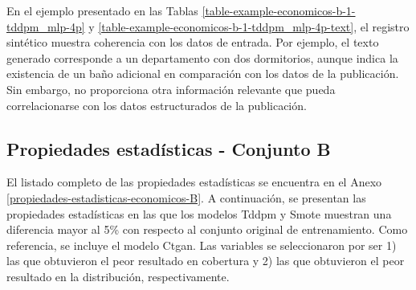 

\newpage
En el ejemplo presentado en las Tablas \ref{table-example-economicos-b-1-tddpm_mlp-4p} y \ref{table-example-economicos-b-1-tddpm_mlp-4p-text}, el registro sintético muestra coherencia con los datos de entrada. Por ejemplo, el texto generado corresponde a un departamento con dos dormitorios, aunque indica la existencia de un baño adicional en comparación con los datos de la publicación. Sin embargo, no proporciona otra información relevante que pueda correlacionarse con los datos estructurados de la publicación.



\newpage
\subsection{Propiedades estadísticas - Conjunto B}
\label{propiedades-conjunto-b}
El listado completo de las propiedades estadísticas se encuentra en el Anexo \ref{propiedades-estadisticas-economicos-B}. A continuación, se presentan las propiedades estadísticas en las que los modelos Tddpm y Smote muestran una diferencia mayor al 5\% con respecto al conjunto original de entrenamiento. Como referencia, se incluye el modelo Ctgan. Las variables se seleccionaron por ser 1) las que obtuvieron el peor resultado en cobertura y 2) las que obtuvieron el peor resultado en la distribución, respectivamente.




